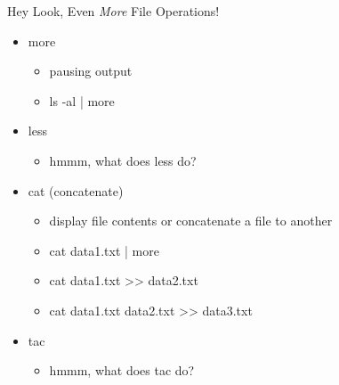 \documentclass{beamer}
\begin{document}
\begin{frame}{Hey Look, Even \textit{More} File Operations!}
\begin{itemize}
\item more
\begin{itemize}
\item pausing output
\item ls -al | more
\end{itemize}
\item less
\begin{itemize}
\item hmmm, what does less do?
\end{itemize}
\item cat (concatenate)
\begin{itemize}
\item display file contents or concatenate a file to another
\item cat data1.txt | more
\item cat data1.txt >> data2.txt
\item cat data1.txt data2.txt >> data3.txt
\end{itemize}
\item tac
\begin{itemize}
\item hmmm, what does tac do?
\end{itemize}
\end{itemize}
\end{frame}

\end{document}
